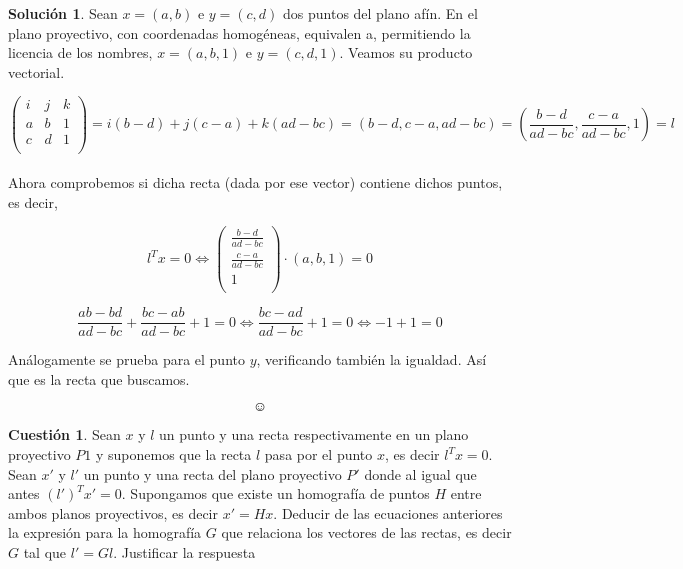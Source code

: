 \documentclass[a4paper, 11pt]{article}
\theoremstyle{definition}
\newtheorem{cuestion}{Cuestión}
\newtheorem*{solucion}{Solución}
\begin{document}
  \begin{solucion}
      Sean $x=(a,b)$ e $y=(c,d)$ dos puntos del plano afín. En el plano proyectivo,
      con coordenadas homogéneas, equivalen a, permitiendo la licencia de los nombres,
      $x=(a,b,1)$ e $y=(c,d,1)$. Veamos su producto vectorial.

      \[
      \left(
      \begin{array}{ccc}
          i & j & k \\
          a & b & 1 \\
          c & d & 1 \\
      \end{array}
      \right) = i(b-d) + j(c-a) + k(ad-bc) = (b-d,c-a,ad-bc) = (\frac{b-d}{ad-bc},\frac{c-a}{ad-bc},1) = l
      \] \\

      Ahora comprobemos si dicha recta (dada por ese vector) contiene dichos puntos, es decir,

      \[
        l^T x = 0 \Leftrightarrow \left(\begin{array}{ccc}
                                                  \frac{b-d}{ad-bc} \\
                                                  \frac{c-a}{ad-bc} \\
                                                  1 \\
                                                \end{array}\right) \cdot (a,b,1) = 0
      \]

      \[
        \frac{ab -bd}{ad-bc} + \frac{bc-ab}{ad-bc} + 1 = 0 \Leftrightarrow \frac{bc-ad}{ad-bc} + 1 = 0 \Leftrightarrow -1 + 1 = 0
      \]

      Análogamente se prueba para el punto $y$, verificando también la igualdad. Así que es la recta que buscamos.

      $$\smiley$$


  \end{solucion}

  \begin{cuestion}
    Sean $x$ y $l$ un punto y una recta respectivamente en un plano proyectivo $P1$
    y suponemos que la recta $l$ pasa por el punto $x$, es decir $l^Tx=0$. Sean $x'$ y $l'$
    un punto y una recta del plano proyectivo $P'$ donde al igual que antes $(l')^T x'=0$.
    Supongamos que existe un homografía de puntos $H$ entre ambos planos proyectivos,
    es decir $x'=Hx$. Deducir de las ecuaciones anteriores la expresión para la
    homografía $G$ que relaciona los vectores de las rectas, es decir $G$ tal que $l'=Gl$.
    Justificar la respuesta

  \end{cuestion}
\end{document}
